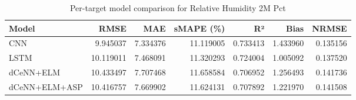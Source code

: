 \begin{table}
\caption{Per-target model comparison for Relative Humidity 2M Pct}
\begin{tabular}{lrrrrrr}
\toprule
Model & RMSE & MAE & sMAPE (\%) & R² & Bias & NRMSE \\
\midrule
CNN & 9.945037 & 7.334376 & 11.119005 & 0.733413 & 1.433960 & 0.135156 \\
LSTM & 10.119011 & 7.468091 & 11.320293 & 0.724004 & 1.005092 & 0.137520 \\
dCeNN+ELM & 10.433497 & 7.707468 & 11.658584 & 0.706952 & 1.256493 & 0.141736 \\
dCeNN+ELM+ASP & 10.416757 & 7.669902 & 11.624131 & 0.707892 & 1.221970 & 0.141508 \\
\bottomrule
\end{tabular}
\end{table}
